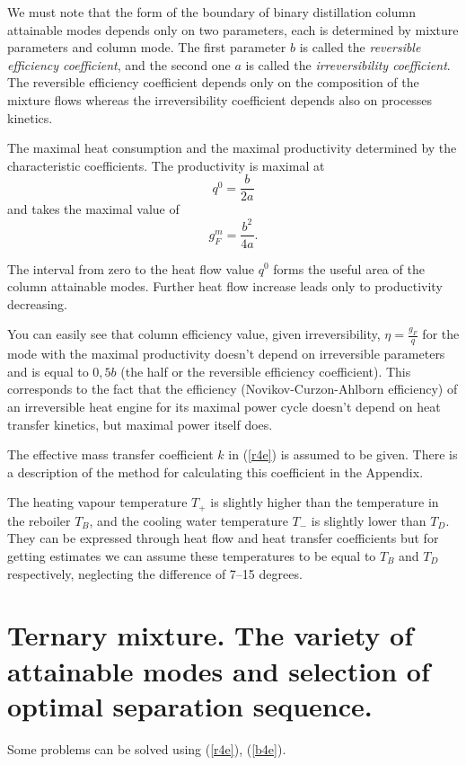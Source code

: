 \documentclass[12pt]{article}
\begin{document}
We must note that the form of the boundary of binary distillation column attainable modes depends only on two parameters, each is determined by mixture parameters and column mode. The first parameter $b$ is called the \textit{reversible efficiency coefficient}, and the second one $a$ is called the \textit{irreversibility coefficient}. The reversible efficiency coefficient depends only on the composition of the mixture flows whereas the irreversibility coefficient depends also on processes kinetics.

The maximal heat consumption and the maximal productivity determined by the characteristic coefficients. The productivity is maximal at
\begin{equation}\label{46n4}
q^0=\frac{b}{2a}
\end{equation}
and takes the maximal value of
\begin{equation}\label{46n5}
g_F^m=\frac{b^2}{4a}.
\end{equation}

The interval from zero to the heat flow value $q^0$ forms the useful area of the column attainable modes. Further heat flow increase leads only to productivity decreasing.

You can easily see that column efficiency value, given irreversibility, $\eta=\frac{g_F}{q}$ for the mode with the maximal productivity doesn't depend on irreversible parameters and is equal to $0,5b$ (the half or the reversible efficiency coefficient). This corresponds to the fact that the efficiency (Novikov-Curzon-Ahlborn efficiency) of an irreversible heat engine for its maximal power cycle doesn't depend on heat transfer kinetics, but maximal power itself does. 

The effective mass transfer coefficient $k$ in (\ref{r4e}) is assumed to be given. There is a description of the method for calculating this coefficient in the Appendix.

The heating vapour temperature $T_+$ is slightly higher than the temperature in the reboiler $T_B$, and the cooling water temperature $T_-$ is slightly lower than $T_D$. They can be expressed through heat flow and heat transfer coefficients but for getting estimates we can assume these temperatures to be equal to $T_B$ and $T_D$ respectively, neglecting the difference of 7--15 degrees.

 
\section {Ternary mixture. The variety of attainable modes and selection of optimal separation sequence.}
Some problems can be solved using (\ref{r4e}), (\ref{b4e}).
\end{document}
